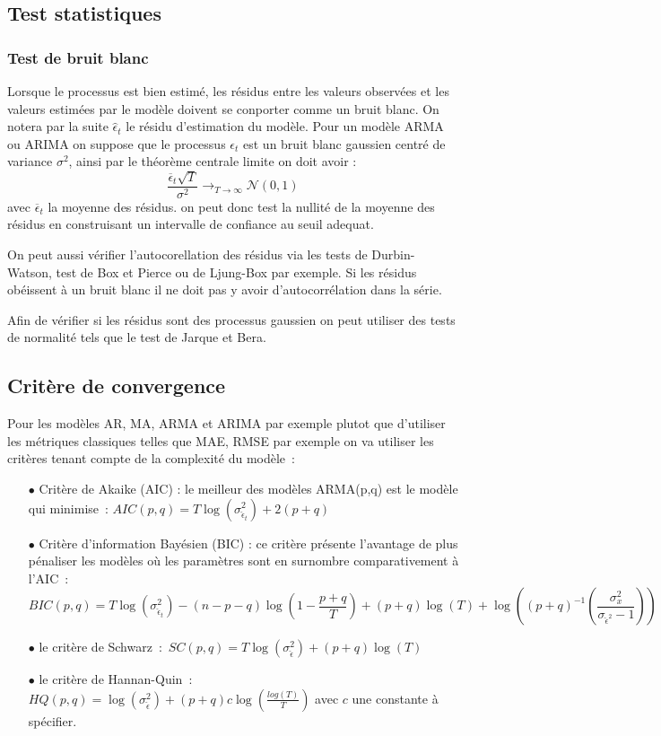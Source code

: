 \documentclass[11pt]{scrartcl} %
\begin{document}
\subsection{Test statistiques}
\subsubsection{Test de bruit blanc}
Lorsque le processus est bien estimé, les résidus entre les valeurs observées et les valeurs estimées par le modèle doivent se conporter comme un bruit blanc. On notera par la suite $\hat{\epsilon}_t$ le résidu d'estimation du modèle. Pour un modèle ARMA ou ARIMA on suppose que le processus $\epsilon_t$ est un bruit blanc gaussien centré de variance $\sigma^2$, ainsi par le théorème centrale limite on doit avoir :
$$
\frac{\overline{\epsilon}_t\sqrt{T}}{\sigma^2}\rightarrow_{T\rightarrow\infty}\mathcal{N}(0,1)
$$
avec $\overline{\epsilon}_t$ la moyenne des résidus. on peut donc test la nullité de la moyenne des résidus en construisant un intervalle de confiance au seuil adequat.

On peut aussi vérifier l'autocorellation des résidus via les tests de Durbin-Watson, test de Box et Pierce ou de Ljung-Box par exemple. Si les résidus obéissent à un bruit blanc il ne doit pas y avoir d'autocorrélation dans la série.

Afin de vérifier si les résidus sont des processus gaussien on peut utiliser des tests de normalité tels que le test de Jarque et Bera.
\subsection{Critère de convergence}
Pour les modèles AR, MA, ARMA et ARIMA par exemple plutot que d'utiliser les métriques classiques telles que MAE, RMSE par exemple on va utiliser les critères tenant compte de la complexité du modèle~:
\begin{itemize}
\item[$\bullet$] Critère de Akaike (AIC) : le meilleur des modèles ARMA(p,q) est le modèle qui minimise~: $AIC(p,q)=T\log\left(\sigma_{\hat{\epsilon}_t}^2\right)+2(p+q)$\\
\item[$\bullet$] Critère d'information Bayésien (BIC) : ce critère présente l'avantage de plus pénaliser les modèles où les paramètres sont en surnombre comparativement à l'AIC~: $$BIC(p,q)=T\log\left(\sigma_{\hat{\epsilon}_t}^2\right)-(n-p-q)\log\left(1-\frac{p+q}{T}\right)+(p+q)\log(T)+\log\left((p+q)^{-1}\left(\frac{\sigma_x^2}{\sigma_{\hat{\epsilon}^2}-1}\right)\right)$$
\item[$\bullet$] le critère de Schwarz~:~$SC(p,q)=T\log\left(\sigma_{\hat{\epsilon}}^2\right)+(p+q)\log(T)$\\
\item[$\bullet$] le critère de Hannan-Quin~:~$HQ(p,q)=\log(\sigma_{\hat{\epsilon}}^2)+(p+q)c\log\left(\frac{log(T)}{T}\right)$ avec $c$ une constante à spécifier.
\end{itemize}


%
\end{document}
